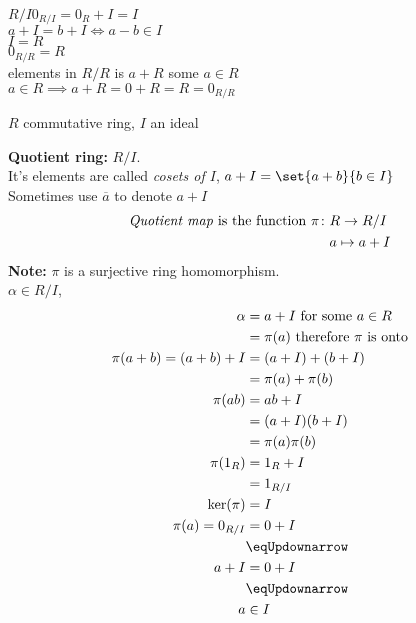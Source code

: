 $R/I$\quad $0_{R/I}=0_R+I=I$ \\
$a+I=b+I \iff a-b\in I$ \\
$I=R$ \\
$0_{R/R}=R$ \\
elements in $R/R$ is $a+R$ some $a\in R$ \\
$a\in R \implies a+R=0+R=R=0_{R/R}$

$R$ commutative ring, $I$ an ideal

\textbf{Quotient ring:} $R/I$. \\
It's elements are called \emph{cosets of $I$}, $a+I=\set{a+b}{b\in I}$ \\
Sometimes use $\overline a$ to denote $a+I$
%
\begin{align*}
\text{\emph{Quotient map} is the function } \pi\colon & R \to R/I \\
& a \mapsto a + I
\end{align*}
\textbf{Note:} $\pi$ is a surjective ring homomorphism. \\
\pf $\alpha\in R/I$,
\begin{align*}
\alpha &= a + I \text{ for some $a\in R$} \\
&= \pi(a) \text{ therefore $\pi$ is onto} \\
\pi(a+b) = (a+b) + I &= (a+I) + (b+I) \\
&= \pi(a) + \pi(b) \\
\pi(ab) &= ab + I \\
&= (a+I)(b+I) \\
&= \pi(a)\pi(b) \\
\pi(1_R) &= 1_R + I \\
&= 1_{R/I} \\
\ker(\pi) &= I \\
\pi(a) = 0_{R/I} &= 0 + I \\
&\eqUpdownarrow \\
a + I &= 0 + I \\
&\eqUpdownarrow \\
a &\in I
\end{align*}

